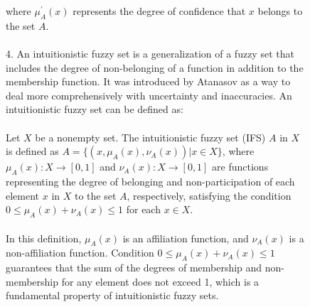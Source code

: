 \documentclass{article}
\begin{document}
\begin{figure}[!t]
\begin{minipage}{0.49\textwidth}
            ~\\
            ~\\
            ~\\
            ~\\
            ~\\
            ~\\
            ~\\
            ~\\
            ~\\
            ~\\
            ~\\
            ~\\
            ~\\
            ~\\
            ~\\
            ~\\
            ~\\
        \end{minipage}
        \hspace{0.5cm}
        \begin{minipage}{0.49\textwidth}
            where \(\mu_{A}^{'}(x)\) represents the degree of confidence that \(x\) belongs to the set \(A\).\\
            ~\\
            4. An intuitionistic fuzzy set is a generalization of a fuzzy set that includes the degree of non-belonging of a function in addition to the membership function. It was introduced by Atanasov as a way to deal more comprehensively with uncertainty and inaccuracies. An intuitionistic fuzzy set can be defined as:\\
            ~\\
            Let $X$ be a nonempty set. The intuitionistic fuzzy set (IFS) $A$ in $X$ is defined as $A = \{(x,\mu_A(x), \nu_A(x)) | x \in X\}$, where $\mu_A(x): X\rightarrow [0,1]$ and $\nu_A(x): X\rightarrow [0,1]$ are functions representing the degree of belonging and non-participation of each element $x$ in $X$ to the set $A$, respectively, satisfying the condition $0\leq\mu_A(x) + \nu_A(x) \leq 1$ for each $x\in X$.\\
            ~\\
            In this definition, $\mu_A(x)$ is an affiliation function, and $\nu_A(x)$ is a non-affiliation function. Condition $0 \leq \mu_A(x) + \nu_A(x)\leq 1$ guarantees that the sum of the degrees of membership and non-membership for any element does not exceed 1, which is a fundamental property of intuitionistic fuzzy sets.\\

\end{minipage}
\end{figure}
\end{document}
